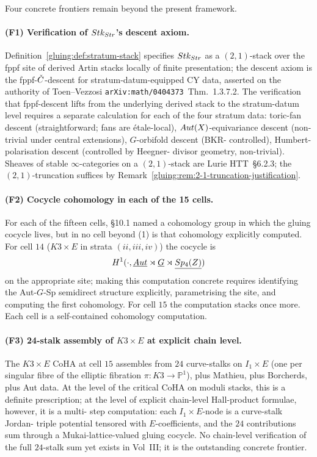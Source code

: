 Four concrete frontiers remain beyond the present framework.

\paragraph{(F1) Verification of $Stk_{Str}$'s descent axiom.}
Definition~\ref{gluing:def:stratum-stack} specifies
$Stk_{Str}$ as a $(2,1)$-stack over the fppf site of derived Artin
stacks locally of finite presentation; the descent axiom is the
fppf-$\check{C}$-descent for stratum-datum-equipped CY data, asserted on
the authority of Toen--Vezzosi \texttt{arXiv:math/0404373}~Thm.~1.3.7.2.
The verification that fppf-descent lifts from the underlying derived
stack to the stratum-datum level requires a separate calculation for
each of the four stratum data: toric-fan descent (straightforward;
fans are \'etale-local), $Aut(X)$-equivariance descent
(non-trivial under central extensions), $G$-orbifold descent (BKR-
controlled), Humbert-polarisation descent (controlled by Heegner-
divisor geometry, non-trivial). Sheaves of stable $\infty$-categories
on a $(2,1)$-stack are Lurie HTT~\S 6.2.3; the $(2,1)$-truncation
suffices by Remark~\ref{gluing:rem:2-1-truncation-justification}.

\paragraph{(F2) Cocycle cohomology in each of the 15 cells.} For each
of the fifteen cells, \S 10.1 named a cohomology group in which the
gluing cocycle lives, but in no cell beyond (1) is that cohomology
explicitly computed. For cell $14$ ($K3\times E$ in strata
$(ii,iii,iv)$) the cocycle is
\[
H^{1}(\cdot,\underline{Aut}\rtimes\underline{G}\rtimes\underline{Sp_{4}(Z)})
\]
on the appropriate site; making this computation concrete requires
identifying the Aut-$G$-Sp semidirect structure explicitly,
parametrising the site, and computing the first cohomology. For cell
$15$ the computation stacks once more. Each cell is a self-contained
cohomology computation.

\paragraph{(F3) 24-stalk assembly of $K3\times E$ at explicit chain
level.} The $K3\times E$ CoHA at cell $15$ assembles from $24$
curve-stalks on $I_{1}\times E$ (one per singular fibre of the
elliptic fibration $\pi:K3\to\mathbb{P}^{1}$), plus Mathieu, plus
Borcherds, plus Aut data. At the level of the critical CoHA on
moduli stacks, this is a definite prescription; at the level of
explicit chain-level Hall-product formulae, however, it is a multi-
step computation: each $I_{1}\times E$-node is a curve-stalk Jordan-
triple potential tensored with $E$-coefficients, and the $24$
contributions sum through a Mukai-lattice-valued gluing cocycle. No
chain-level verification of the full $24$-stalk sum yet exists in
Vol~III; it is the outstanding concrete frontier.

